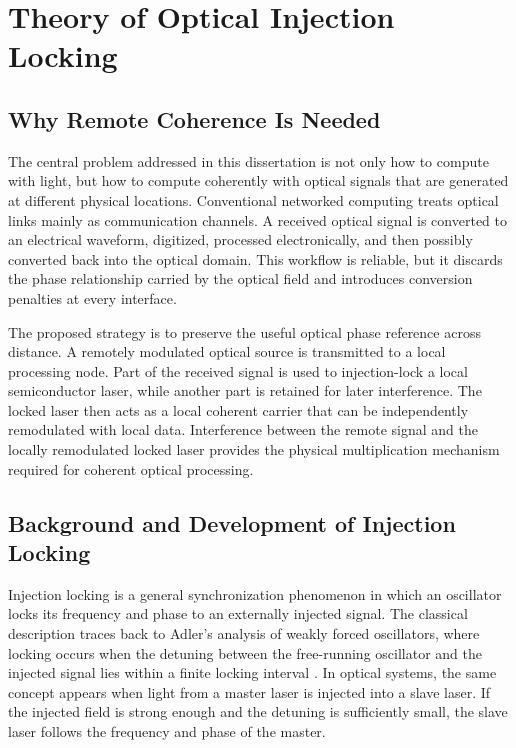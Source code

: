 \chapter{Theory of Optical Injection Locking}

\section{Why Remote Coherence Is Needed}

The central problem addressed in this dissertation is not only how to compute with light, but how to compute coherently with optical signals that are generated at different physical locations. Conventional networked computing treats optical links mainly as communication channels. A received optical signal is converted to an electrical waveform, digitized, processed electronically, and then possibly converted back into the optical domain. This workflow is reliable, but it discards the phase relationship carried by the optical field and introduces conversion penalties at every interface.

The proposed strategy is to preserve the useful optical phase reference across distance. A remotely modulated optical source is transmitted to a local processing node. Part of the received signal is used to injection-lock a local semiconductor laser, while another part is retained for later interference. The locked laser then acts as a local coherent carrier that can be independently remodulated with local data. Interference between the remote signal and the locally remodulated locked laser provides the physical multiplication mechanism required for coherent optical processing.

\section{Background and Development of Injection Locking}

Injection locking is a general synchronization phenomenon in which an oscillator locks its frequency and phase to an externally injected signal. The classical description traces back to Adler's analysis of weakly forced oscillators, where locking occurs when the detuning between the free-running oscillator and the injected signal lies within a finite locking interval \cite{adler1946study}. In optical systems, the same concept appears when light from a master laser is injected into a slave laser. If the injected field is strong enough and the detuning is sufficiently small, the slave laser follows the frequency and phase of the master.

